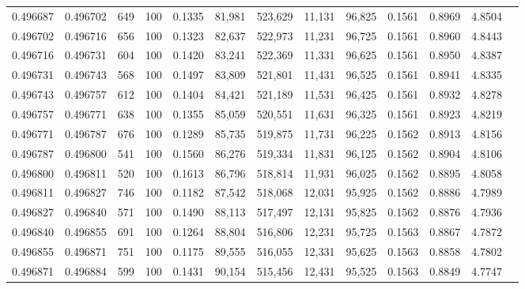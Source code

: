 \begin{tabular}{rrrrrrrrrrrrr}
0.496687 & 0.496702 &   649 & 100 &                                     0.1335 &  81,981 & 523,629 &  11,131 &  96,825 & 0.1561 & 0.8969 & 4.8504 \\
0.496702 & 0.496716 &   656 & 100 &                                     0.1323 &  82,637 & 522,973 &  11,231 &  96,725 & 0.1561 & 0.8960 & 4.8443 \\
0.496716 & 0.496731 &   604 & 100 &                                     0.1420 &  83,241 & 522,369 &  11,331 &  96,625 & 0.1561 & 0.8950 & 4.8387 \\
0.496731 & 0.496743 &   568 & 100 &                                     0.1497 &  83,809 & 521,801 &  11,431 &  96,525 & 0.1561 & 0.8941 & 4.8335 \\
0.496743 & 0.496757 &   612 & 100 &                                     0.1404 &  84,421 & 521,189 &  11,531 &  96,425 & 0.1561 & 0.8932 & 4.8278 \\
0.496757 & 0.496771 &   638 & 100 &                                     0.1355 &  85,059 & 520,551 &  11,631 &  96,325 & 0.1561 & 0.8923 & 4.8219 \\
0.496771 & 0.496787 &   676 & 100 &                                     0.1289 &  85,735 & 519,875 &  11,731 &  96,225 & 0.1562 & 0.8913 & 4.8156 \\
0.496787 & 0.496800 &   541 & 100 &                                     0.1560 &  86,276 & 519,334 &  11,831 &  96,125 & 0.1562 & 0.8904 & 4.8106 \\
0.496800 & 0.496811 &   520 & 100 &                                     0.1613 &  86,796 & 518,814 &  11,931 &  96,025 & 0.1562 & 0.8895 & 4.8058 \\
0.496811 & 0.496827 &   746 & 100 &                                     0.1182 &  87,542 & 518,068 &  12,031 &  95,925 & 0.1562 & 0.8886 & 4.7989 \\
0.496827 & 0.496840 &   571 & 100 &                                     0.1490 &  88,113 & 517,497 &  12,131 &  95,825 & 0.1562 & 0.8876 & 4.7936 \\
0.496840 & 0.496855 &   691 & 100 &                                     0.1264 &  88,804 & 516,806 &  12,231 &  95,725 & 0.1563 & 0.8867 & 4.7872 \\
0.496855 & 0.496871 &   751 & 100 &                                     0.1175 &  89,555 & 516,055 &  12,331 &  95,625 & 0.1563 & 0.8858 & 4.7802 \\
0.496871 & 0.496884 &   599 & 100 &                                     0.1431 &  90,154 & 515,456 &  12,431 &  95,525 & 0.1563 & 0.8849 & 4.7747 \\

\end{tabular}

